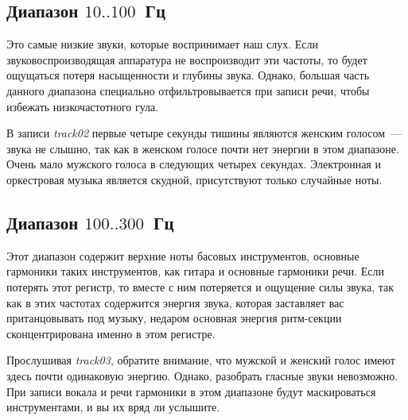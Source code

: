 \documentclass{beamer}
\begin{document}
\subsection{Диапазон $10..100$~Гц}
\begin{frame}
Это самые низкие звуки, которые воспринимает наш слух. Если звуковоспроизводящая аппаратура не воспроизводит эти частоты, то будет ощущаться потеря насыщенности и глубины звука. Однако, большая часть данного диапазона специально отфильтровывается при записи речи, чтобы избежать низкочастотного гула. 

В записи \emph{track02} первые четыре секунды тишины являются женским голосом~--- звука не слышно, так как в женском голосе почти нет энергии в этом диапазоне. Очень мало мужского голоса в следующих четырех секундах. Электронная и оркестровая музыка является скудной, присутствуют только случайные ноты.

\end{frame}

\subsection{Диапазон $100..300$~Гц}
\begin{frame}
Этот диапазон содержит верхние ноты басовых инструментов, основные гармоники таких инструментов, как гитара и основные гармоники речи. Если потерять этот регистр, то вместе с ним потеряется и ощущение силы звука, так как в этих частотах содержится энергия звука, которая заставляет вас пританцовывать под музыку, недаром основная энергия ритм-секции сконцентрирована именно в этом регистре.

Прослушивая \emph{track03}, обратите внимание, что мужской и женский голос имеют здесь почти одинаковую энергию. Однако, разобрать гласные звуки невозможно. При записи вокала и речи гармоники в этом диапазоне будут маскироваться инструментами, и вы их вряд ли услышите.

\end{frame}
\end{document}
